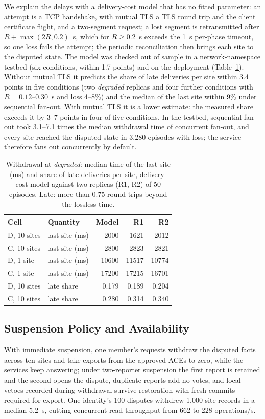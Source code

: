 \documentclass[journal]{IEEEtran}
\theoremstyle{definition}
\begin{document}
We explain the delays with a delivery-cost model that has no fitted parameter: an attempt is a TCP handshake, with mutual TLS a TLS round trip and the client certificate flight, and a two-segment request; a lost segment is retransmitted after $R+\max(2R,0.2)$~s, which for $R\ge0.2$~s exceeds the 1~s per-phase timeout, so one loss fails the attempt; the periodic reconciliation then brings each site to the disputed state. The model was checked out of sample in a network-namespace testbed (six conditions, within 1.7 points) and on the deployment (Table~\ref{tab:netem}). Without mutual TLS it predicts the share of late deliveries per site within 3.4 points in five conditions (two \emph{degraded} replicas and four further conditions with $R=0.12$--0.30~s and loss 4--8\%) and the median of the last site within 9\% under sequential fan-out. With mutual TLS it is a lower estimate: the measured share exceeds it by 3--7 points in four of five conditions. In the testbed, sequential fan-out took 3.1--7.1 times the median withdrawal time of concurrent fan-out, and every site reached the disputed state in 3,280 episodes with loss; the service therefore fans out concurrently by default.

\begin{table}[t]
\centering
\caption{Withdrawal at \emph{degraded}: median time of the last site (ms) and share of late deliveries per site, delivery-cost model against two replicas (R1, R2) of 50 episodes. Late: more than 0.75 round trips beyond the lossless time.}
\label{tab:netem}
\scriptsize
\begin{tabular}{@{}llrrr@{}}
\toprule
Cell & Quantity & Model & R1 & R2 \\
\midrule
D, 10 sites & last site (ms) & 2000 & 1621 & 2012 \\
C, 10 sites & last site (ms) & 2800 & 2823 & 2821 \\
D, 1 site & last site (ms) & 10600 & 11517 & 10774 \\
C, 1 site & last site (ms) & 17200 & 17215 & 16701 \\
D, 10 sites & late share & 0.179 & 0.189 & 0.204 \\
C, 10 sites & late share & 0.280 & 0.314 & 0.340 \\
\bottomrule
\end{tabular}
\end{table}

\subsection{Suspension Policy and Availability}
\label{sec:suspension-policy}
With immediate suspension, one member's requests withdraw the disputed facts across ten sites and take exports from the approved ACEs to zero, while the services keep answering; under two-reporter suspension the first report is retained and the second opens the dispute, duplicate reports add no votes, and local vetoes recorded during withdrawal survive restoration with fresh commits required for export. One identity's 100 disputes withdrew 1,000 site records in a median 5.2~s, cutting concurrent read throughput from 662 to 228 operations/s.
\end{document}

